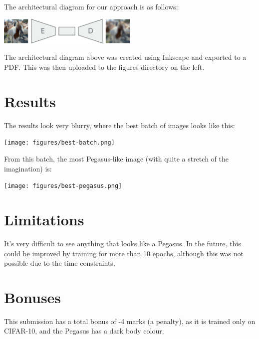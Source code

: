 \documentclass{article}
\begin{document}
The architectural diagram for our approach is as follows:
\begin{center}
    \includegraphics[width=0.5\textwidth]{figures/architecture.pdf}
\end{center}
The architectural diagram above was created using Inkscape and exported to a PDF. This was then uploaded to the figures directory on the left.

\section{Results}
The results look very blurry, where the best batch of images looks like this:
\begin{center}
    \texttt{[image: figures/best-batch.png]}
\end{center}
From this batch, the most Pegasus-like image (with quite a stretch of the imagination) is:
\begin{center}
    \texttt{[image: figures/best-pegasus.png]}
\end{center}

\section{Limitations}
It's very difficult to see anything that looks like a Pegasus. In the future, this could be improved by training for more than 10 epochs, although this was not possible due to the time constraints.

\section*{Bonuses}
This submission has a total bonus of -4 marks (a penalty), as it is trained only on CIFAR-10, and the Pegasus has a dark body colour.

\printbibliography
\end{document}
